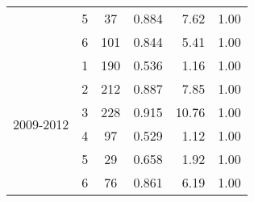 \begin{table}[htbp]
\begin{tabular}{rrcrrr}
    \multicolumn{1}{c}{} & \multicolumn{1}{c}{5} & \multicolumn{1}{c}{37} & \multicolumn{1}{c}{0.884 } & \multicolumn{1}{r}{7.62 } & \multicolumn{1}{c}{1.00 } \\
    \multicolumn{1}{c}{} & \multicolumn{1}{c}{6} & \multicolumn{1}{c}{101} & \multicolumn{1}{c}{0.844 } & \multicolumn{1}{r}{5.41 } & \multicolumn{1}{c}{1.00 } \\\midrule
    \multicolumn{1}{c}{\multirow{6}[2]{*}{\begin{sideways}2009-2012\end{sideways}}} & \multicolumn{1}{c}{1} & \multicolumn{1}{r}{190} & \multicolumn{1}{c}{0.536 } & \multicolumn{1}{r}{1.16 } & \multicolumn{1}{c}{1.00 } \\
    \multicolumn{1}{c}{} & \multicolumn{1}{c}{2} & \multicolumn{1}{c}{212} & \multicolumn{1}{c}{0.887 } & \multicolumn{1}{r}{7.85 } & \multicolumn{1}{c}{1.00 } \\
    \multicolumn{1}{c}{} & \multicolumn{1}{c}{3} & \multicolumn{1}{c}{228} & \multicolumn{1}{c}{0.915 } & \multicolumn{1}{r}{10.76 } & \multicolumn{1}{c}{1.00 } \\
    \multicolumn{1}{c}{} & \multicolumn{1}{c}{4} & \multicolumn{1}{c}{97} & \multicolumn{1}{c}{0.529 } & \multicolumn{1}{r}{1.12 } & \multicolumn{1}{c}{1.00 } \\
    \multicolumn{1}{c}{} & \multicolumn{1}{c}{5} & \multicolumn{1}{c}{29} & \multicolumn{1}{c}{0.658 } & \multicolumn{1}{r}{1.92 } & \multicolumn{1}{c}{1.00 } \\
    \multicolumn{1}{c}{} & \multicolumn{1}{c}{6} & \multicolumn{1}{c}{76} & \multicolumn{1}{c}{0.861 } & \multicolumn{1}{r}{6.19 } & \multicolumn{1}{c}{1.00 } \\
    \bottomrule
    \end{tabular}%
  \label{tab:SO4SWPHPA}%
\end{table}%
